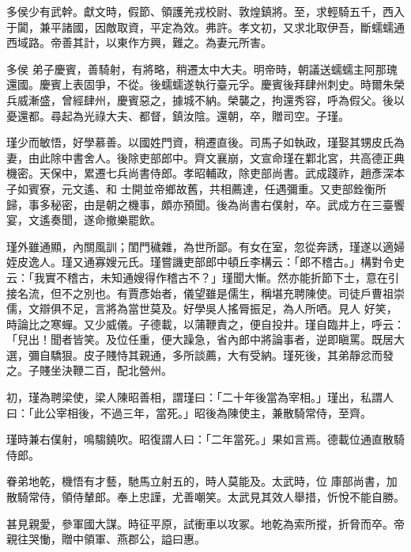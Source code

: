 \begin{pinyinscope}
 多侯少有武幹。獻文時，假節、領護羌戎校尉、敦煌鎮將。至，求輕騎五千，西入于闐，兼平諸國，因敵取資，平定為效。弗許。孝文初，又求北取伊吾，斷蠕蠕通西域路。帝善其計，以東作方興，難之。為妻元所害。



 多侯
 弟子慶賓，善騎射，有將略，稍遷太中大夫。明帝時，朝議送蠕蠕主阿那瑰還國。慶賓上表固爭，不從。後蠕蠕遂執行臺元孚。慶賓後拜肆州刺史。時爾朱榮兵威漸盛，曾經肆州，慶賓惡之，據城不納。榮襲之，拘還秀容，呼為假父。後以憂還都。尋起為光祿大夫、都督，鎮汝陰。還朝，卒，贈司空。子瑾。



 瑾少而敏悟，好學慕善。以國姓門資，稍遷直後。司馬子如執政，瑾娶其甥皮氏為妻，由此除中書舍人。後除吏部郎中。齊文襄崩，文宣命瑾在鄴北宮，共高德正典機密。天保中，累遷七兵尚書侍郎。孝昭輔政，除吏部尚書。武成踐祚，趙彥深本子如賓寮，元文遙、和
 士開並帝鄉故舊，共相薦達，任遇彌重。又吏部銓衡所歸，事多秘密，由是朝之機事，頗亦預聞。後為尚書右僕射，卒。武成方在三臺饗宴，文遙奏聞，遂命撤樂罷飲。



 瑾外雖通顯，內關風訓；閨門穢雜，為世所鄙。有女在室，忽從奔誘，瑾遂以適婦姪皮逸人。瑾又通寡嫂元氏。瑾嘗譏吏部郎中頓丘李構云：「郎不稽古。」構對令史云：「我實不稽古，未知通嫂得作稽古不？」瑾聞大慚。然亦能折節下士，意在引接名流，但不之別也。有賈彥始者，儀望雖是儒生，稱堪充聘陳使。司徒戶曹祖崇儒，文辯俱不足，言將為當世莫及。好學吳人搖脣振足，為人所哂。見人
 好笑，時論比之寒蟬。又少威儀。子德載，以蒲鞭責之，便自投井。瑾自臨井上，呼云：「兒出！聞者皆笑。及位任重，便大躁急，省內郎中將論事者，逆即瞋罵。既居大選，彌自驕狠。皮子賤恃其親通，多所談薦，大有受納。瑾死後，其弟靜忿而發之。子賤坐決鞭二百，配北營州。



 初，瑾為聘梁使，梁人陳昭善相，謂瑾曰：「二十年後當為宰相。」瑾出，私謂人曰：「此公宰相後，不過三年，當死。」昭後為陳使主，兼散騎常侍，至齊。



 瑾時兼右僕射，鳴騶鐃吹。昭復謂人曰：「二年當死。」果如言焉。德載位通直散騎侍郎。



 眷弟地乾，機悟有才藝，馳馬立射五的，時人莫能及。太武時，位
 庫部尚書，加散騎常侍，領侍輦郎。奉上忠謹，尤善嘲笑。太武見其效人舉措，忻悅不能自勝。



 甚見親愛，參軍國大謀。時征平原，試衝車以攻冢。地乾為索所摐，折脅而卒。帝親往哭慟，贈中領軍、燕郡公，謚曰惠。




\end{pinyinscope}

